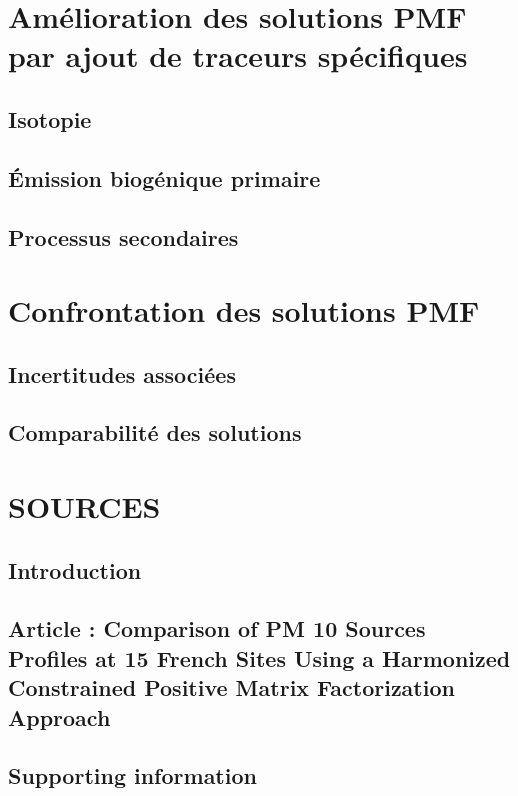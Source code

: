 
\section{Amélioration des solutions PMF par ajout de traceurs spécifiques}%
\label{sec:amélioration_des_solutions_pmf}

\subsection{Isotopie}%
\label{sub:isotopie}

\subsection{Émission biogénique primaire}%
\label{sub:émission_biogénique_primaire}

\subsection{Processus secondaires}%
\label{sub:processus_secondaires}

\section{Confrontation des solutions PMF}%
\label{sec:confrontation_des_solutions_pmf}

\subsection{Incertitudes associées}%
\label{sub:incertitudes_associées}

\subsection{Comparabilité des solutions}%
\label{sub:comparabilité_des_solutions}

\section{SOURCES}%
\label{sec:sources}

\subsection{Introduction}

\subsection{Article : Comparison of PM 10 Sources Profiles at 15 French Sites Using a Harmonized Constrained Positive Matrix Factorization Approach}%
\label{sub:article}



\subsection{Supporting information}%
\label{sub:supporting_information}




